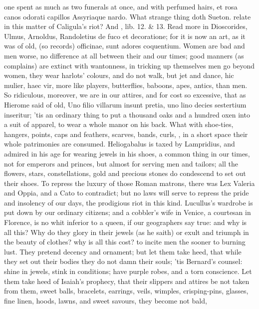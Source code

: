 one spent as much as two funerals at once, and with perfumed hairs,
et rosa canos odorati capillos Assyriaque nardo. What strange
thing doth Sueton. relate in this matter of Caligula's riot? And
\Pliny{}, lib. 12. \& 13. Read more in Dioscorides, Ulmus, Arnoldus,
Randoletius de fuco et decoratione; for it is now an art, as it was of
old, (so \Seneca{} records) officinae, sunt adores coquentium. Women
are bad and men worse, no difference at all between their and our
times; good manners (as \Seneca{} complains) are extinct with
wantonness, in tricking up themselves men go beyond women, they wear
harlots' colours, and do not walk, but jet and dance, hic mulier, haec
vir, more like players, butterflies, baboons, apes, antics, than men.
So ridiculous, moreover, we are in our attires, and for cost so
excessive, that as Hierome said of old, Uno filio villarum insunt
pretia, uno lino decies sestertium inseritur; 'tis an ordinary thing to
put a thousand oaks and a hundred oxen into a suit of apparel, to wear
a whole manor on his back. What with shoe-ties, hangers, points, caps
and feathers, scarves, bands, curls, \etc{}, in a short space their whole
patrimonies are consumed. Heliogabalus is taxed by Lampridius, and
admired in his age for wearing jewels in his shoes, a common thing in
our times, not for emperors and princes, but almost for serving men and
tailors; all the flowers, stars, constellations, gold and precious
stones do condescend to set out their shoes. To repress the luxury of
those Roman matrons, there was Lex Valeria and Oppia, and a Cato
to contradict; but no laws will serve to repress the pride and
insolency of our days, the prodigious riot in this kind. Lucullus's
wardrobe is put down by our ordinary citizens; and a cobbler's wife in
Venice, a courtesan in Florence, is no whit inferior to a queen, if our
geographers say true: and why is all this? Why do they glory in their
jewels (as he saith) or exult and triumph in the beauty of
clothes? why is all this cost? to incite men the sooner to burning
lust. They pretend decency and ornament; but let them take heed, that
while they set out their bodies they do not damn their souls; 'tis
Bernard's counsel: shine in jewels, stink in conditions; have
purple robes, and a torn conscience. Let them take heed of Isaiah's
prophecy, that their slippers and attires be not taken from them, sweet
balls, bracelets, earrings, veils, wimples, crisping-pins, glasses,
fine linen, hoods, lawns, and sweet savours, they become not bald,
